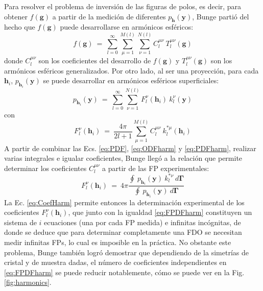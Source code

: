 Para resolver el problema de inversión de las figuras de polos, es decir, para obtener $f(\mathbf{g})$ a partir de la medición de diferentes $p_{\mathbf{h}}(\mathbf{y})$, Bunge partió del hecho que $f(\mathbf{g})$ puede desarrollarse en armónicos esféricos:
\begin{equation}
  f(\mathbf{g}) \ = \ \sum_{l=0}^{\infty} \sum_{\mu=1}^{M(l)} \sum_{\nu=1}^{N(l)} C_{l}^{\mu \nu} \ T_{l}^{\mu \nu}(\mathbf{g})
  \label{eq:ODFharm}
\end{equation}
\noindent
donde $C_{l}^{\mu \nu}$ son los coeficientes del desarrollo de $f(\mathbf{g})$ y $T_{l}^{\mu \nu}(\mathbf{g})$ son los armónicos esféricos generalizados.
Por otro lado, al ser una proyección, para cada $\mathbf{h}_i$, $p_{\mathbf{h}_i}(\mathbf{y})$ se puede desarrollar en armónicos esféricos superficiales:
\begin{equation}
  p_{\mathbf{h}_i}(\mathbf{y}) \ = \ \sum_{l=0}^{\infty} \sum_{\nu=1}^{N(l)} F_{l}^{\nu}(\mathbf{h}_i) \ k_{l}^{\nu}(\mathbf{y})
  \label{eq:PDFharm}
\end{equation}
\noindent
con
\begin{equation}
  F_{l}^{\nu}(\mathbf{h}_i) \ = \ \frac{4 \pi}{2l + 1} \sum_{\mu=1}^{M(l)} C_{l}^{\mu \nu} \ k_{l}^{* \mu}(\mathbf{h}_i)
  \label{eq:FPDFharm}
\end{equation}
\noindent
A partir de combinar las Ecs. \ref{eq:PDF}, \ref{eq:ODFharm} y \ref{eq:PDFharm}, realizar varias integrales e igualar coeficientes, Bunge llegó a la relación que permite determinar los coeficientes $C_{l}^{\mu \nu}$ a partir de las FP experimentales\cite{bunge2013texture}:
\begin{equation}
  F_{l}^{\nu}(\mathbf{h}_i) \ = \ 4 \pi \frac{\oint \ p_{\mathbf{h}_i}(\mathbf{y}) \ k_{l}^{* \nu} \ d\mathbf{\Gamma}}{\oint \ p_{\mathbf{h}_i}(\mathbf{y}) \ d\mathbf{\Gamma}}
  \label{eq:CoefHarm}
\end{equation}
\noindent
La Ec. \ref{eq:CoefHarm} permite entonces la determinación experimental de los coeficientes $F_{l}^{\nu}(\mathbf{h}_i)$, que junto con la igualdad \ref{eq:FPDFharm} constituyen un sistema de $i$ ecuaciones (una por cada FP medida) e infinitas incógnitas, de donde se deduce que para determinar completamente una FDO se necesitan medir infinitas FPs, lo cual es imposible en la práctica.
No obstante este problema, Bunge\cite{bunge2013texture} también logró demostrar que dependiendo de la simetrías de cristal y de muestra dadas, el número de coeficientes independientes en \ref{eq:FPDFharm} se puede reducir notablemente, cómo se puede ver en la Fig. \ref{fig:harmonics}.
